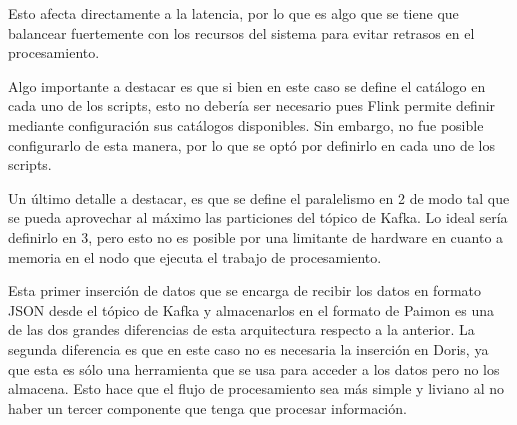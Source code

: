 Esto afecta directamente a la latencia, por lo que es algo que se tiene que balancear fuertemente con 
los recursos del sistema para evitar retrasos en el procesamiento.\newline

\newpage

Algo importante a destacar es que si bien en este caso se define el catálogo en cada uno de los scripts, 
esto no debería ser necesario pues Flink permite definir mediante configuración sus catálogos disponibles.
Sin embargo, no fue posible configurarlo de esta manera, por lo que se optó por definirlo en cada uno de los scripts.\newline

Un último detalle a destacar, es que se define el paralelismo en 2 de modo tal que se pueda aprovechar al máximo 
las particiones del tópico de Kafka. Lo ideal sería definirlo en 3, 
pero esto no es posible por una limitante de hardware en cuanto a memoria en el nodo que ejecuta el trabajo de procesamiento.\newline

Esta primer inserción de datos que se encarga de recibir los datos en formato JSON desde el tópico de Kafka
y almacenarlos en el formato de Paimon es una de las dos grandes diferencias de esta arquitectura respecto a la anterior.
La segunda diferencia es que en este caso no es necesaria la inserción en Doris, ya que esta es sólo una herramienta que se usa para acceder a los datos pero no los almacena. 
Esto hace que el flujo de procesamiento sea más simple y liviano al no haber un tercer componente que tenga que procesar información. 